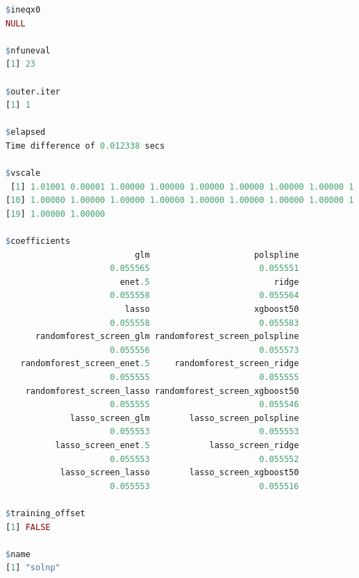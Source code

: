 \documentclass[12pt, krantz2,]{krantz}
\theoremstyle{definition}
\theoremstyle{definition}
\theoremstyle{definition}
\newcommand{\1}{\mathbbm{1}}
\begin{document}
\begin{lstlisting}[language=R]
$ineqx0
NULL

$nfuneval
[1] 23

$outer.iter
[1] 1

$elapsed
Time difference of 0.012338 secs

$vscale
 [1] 1.01001 0.00001 1.00000 1.00000 1.00000 1.00000 1.00000 1.00000 1.00000
[10] 1.00000 1.00000 1.00000 1.00000 1.00000 1.00000 1.00000 1.00000 1.00000
[19] 1.00000 1.00000

$coefficients
                          glm                     polspline 
                     0.055565                      0.055551 
                       enet.5                         ridge 
                     0.055558                      0.055564 
                        lasso                     xgboost50 
                     0.055558                      0.055583 
      randomforest_screen_glm randomforest_screen_polspline 
                     0.055556                      0.055573 
   randomforest_screen_enet.5     randomforest_screen_ridge 
                     0.055555                      0.055555 
    randomforest_screen_lasso randomforest_screen_xgboost50 
                     0.055555                      0.055546 
             lasso_screen_glm        lasso_screen_polspline 
                     0.055553                      0.055553 
          lasso_screen_enet.5            lasso_screen_ridge 
                     0.055553                      0.055552 
           lasso_screen_lasso        lasso_screen_xgboost50 
                     0.055553                      0.055516 

$training_offset
[1] FALSE

$name
[1] "solnp"


\end{lstlisting}
\end{document}
